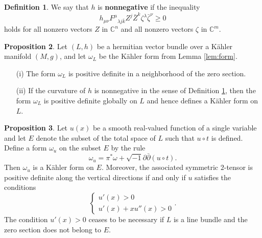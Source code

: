 \documentclass{article}
\numberwithin{equation}{section}
\theoremstyle{definition}
\newtheorem{definition}{Definition}[section]
\theoremstyle{theorem}
\newtheorem{proposition}[definition]{Proposition}
\newcommand{\ddb}{\partial\bar{\partial}}
\begin{document}
\begin{definition}\label{def:poscurv}
We say that $h$ is \textbf{nonnegative} if the inequality 
\[
h_{\mu \nu} F^{\mu}{}_{\lambda j \bar{k}} Z^j \bar{Z}^k\zeta^\lambda \bar{\zeta}^\nu \geqslant 0
\]
holds for all nonzero vectors $Z$ in $\mathbb{C}^n$ and all nonzero vectors $\zeta$ in $\mathbb{C}^m$.

\end{definition}


\begin{proposition}\label{prop:exis}
Let $(L,h)$ be a hermitian vector bundle over a K\"ahler manifold $(M,g)$, and let $\omega_L$ be the K\"ahler form from Lemma \ref{lem:form}. 
\begin{enumerate}
\item[(i)] The form $\omega_L$ is positive definite in a neighborhood of the zero section. 
\item[(ii)] If the curvature of $h$ is nonnegative in the sense of Definition \ref{def:poscurv}, then the form $\omega_L$ is positive definite globally on $L$ and hence defines a K\"ahler form on $L$. 
\end{enumerate}
\end{proposition}


\begin{proposition}\label{prop:u}
Let $u(x)$ be a smooth real-valued function of a single variable and let $E$ denote the subset of the total space of $L$ such that $u \circ t$ is defined. Define a form $\omega_u$ on the subset $E$ by the rule
\[
\omega_u = \pi^* \omega + \sqrt{-1}\ddb (u \circ t).
\]
Then $\omega_u$ is a K\"ahler form on $E$. Moreover, the associated symmetric $2$-tensor is positive definite along the vertical directions if and only if  $u$ satisfies the conditions 
\[
\begin{cases}
u'(x) > 0 \\
u'(x) + x u''(x) > 0
\end{cases}.
\]
The condition $u'(x) > 0$ ceases to be necessary if $L$ is a line bundle and the zero section does not belong to $E$. 
\end{proposition}
\end{document}
